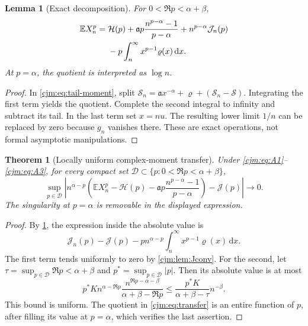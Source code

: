 \documentclass[11pt,a4paper]{article}
\newtheorem{theorem}{Theorem}[section]
\newtheorem{lemma}[lemma]{Lemma}
\theoremstyle{definition}\newaliascnt{definition}{theorem}
\theoremstyle{remark}\newaliascnt{remark}{theorem}
\newcommand{\dd}{\mathrm d}
\newcommand{\ljE}{\mathbb E}
\begin{document}
\begin{lemma}[Exact decomposition]
\label{cjm:lem:exact}
For $0<\Re p<\alpha+\beta$,
\begin{align}
 \ljE X_n^p={}&\mathcal H(p)+\mathfrak a p\frac{n^{p-\alpha}-1}{p-\alpha}
       +n^{p-\alpha}\mathcal J_n(p)\notag\\
       &-p\int_n^\infty x^{p-1}\varrho(x)\,\dd x.
 \label{cjm:eq:exact-decomposition}
\end{align}
At $p=\alpha$, the quotient is interpreted as $\log n$.
\end{lemma}
\begin{proof}
In \eqref{cjm:eq:tail-moment}, split
$\mathcal S_n=\mathfrak a x^{-\alpha}+\varrho+(\mathcal S_n-\mathcal S)$.
Integrating the first term yields the quotient. Complete the second integral
to infinity and subtract its tail. In the last term set $x=nu$. The resulting
lower limit $1/n$ can be replaced by zero because $g_n$ vanishes there. These
are exact operations, not formal asymptotic manipulations.
\end{proof}

\begin{theorem}[Locally uniform complex-moment transfer]
\label{cjm:thm:transfer}
Under \eqref{cjm:eq:A1}--\eqref{cjm:eq:A3}, for every compact set
$\mathcal D\subset\{p:0<\Re p<\alpha+\beta\}$,
\begin{equation}
 \sup_{p\in\mathcal D}\left|
 n^{\alpha-p}\left(
 \ljE X_n^p-\mathcal H(p)-\mathfrak a p\frac{n^{p-\alpha}-1}{p-\alpha}
 \right)-\mathcal J(p)\right|\longrightarrow0.
 \label{cjm:eq:transfer}
\end{equation}
The singularity at $p=\alpha$ is removable in the displayed expression.
\end{theorem}
\begin{proof}
By \cref{cjm:lem:exact}, the expression inside the absolute value is
\[
 \mathcal J_n(p)-\mathcal J(p)-p n^{\alpha-p}\int_n^\infty x^{p-1}\varrho(x)\,\dd x.
\]
The first term tends uniformly to zero by \cref{cjm:lem:Jconv}. For the
second, let $\tau=\sup_{p\in\mathcal D}\Re p<\alpha+\beta$ and
$p^\ast=\sup_{p\in\mathcal D}|p|$. Then its absolute value is at most
\[
 p^\ast K n^{\alpha-\Re p}
 \frac{n^{\Re p-\alpha-\beta}}{\alpha+\beta-\Re p}
 \le\frac{p^\ast K}{\alpha+\beta-\tau}n^{-\beta}.
\]
This bound is uniform. The quotient in \eqref{cjm:eq:transfer} is an entire
function of $p$, after filling its value at $p=\alpha$, which verifies the
last assertion.
\end{proof}
\end{document}
